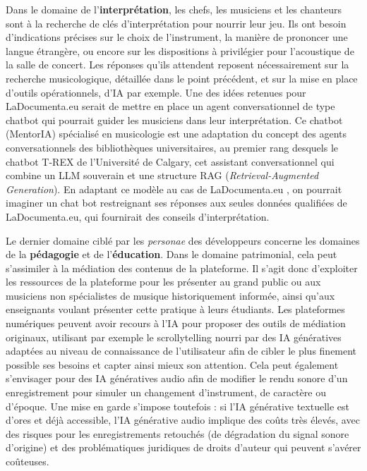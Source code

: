 Dans le domaine de l’\textbf{interprétation}, les chefs, les musiciens et les chanteurs sont à la recherche de clés d’interprétation pour nourrir leur jeu. Ils ont besoin d’indications précises sur le choix de l’instrument, la manière de prononcer une langue étrangère, ou encore sur les dispositions à privilégier pour l’acoustique de la salle de concert. Les réponses qu’ils attendent reposent nécessairement sur la recherche musicologique, détaillée dans le point précédent, et sur la mise en place d’outils opérationnels, d’IA par exemple. Une des idées retenues pour LaDocumenta.eu serait de mettre en place un agent conversationnel de type chatbot qui pourrait guider les musiciens dans leur interprétation. Ce chatbot (MentorIA) spécialisé en musicologie est une adaptation du concept des agents conversationnels des bibliothèques universitaires, au premier rang desquels le chatbot T-REX de l'Université de Calgary, cet assistant conversationnel qui combine un LLM souverain et une structure RAG (\textit{Retrieval-Augmented Generation}).
En adaptant ce modèle au cas de LaDocumenta.eu , on pourrait imaginer un chat bot restreignant ses réponses aux seules données qualifiées de LaDocumenta.eu, qui fournirait des conseils d'interprétation. 


Le dernier domaine ciblé par les \textit{personae} des développeurs concerne les domaines de la \textbf{pédagogie} et de l’\textbf{éducation}. Dans le domaine patrimonial, cela peut s’assimiler à la médiation des contenus de la plateforme. Il s’agit donc d’exploiter les ressources de la plateforme pour les présenter au grand public ou aux musiciens non spécialistes de musique historiquement informée, ainsi qu’aux enseignants voulant présenter  cette pratique à leurs étudiants. Les plateformes numériques peuvent avoir recours à l’IA pour proposer des outils de médiation originaux, utilisant par exemple le scrollytelling nourri par des IA génératives adaptées au niveau de connaissance de l’utilisateur afin de cibler le plus finement possible ses besoins et capter ainsi mieux son attention. Cela peut également s’envisager pour des IA génératives audio afin de modifier le rendu sonore d’un enregistrement pour simuler un changement d’instrument, de caractère ou d’époque. 
Une mise en garde s’impose toutefois : si l’IA générative textuelle est d’ores et déjà accessible, l’IA générative audio implique des coûts très élevés, avec des risques pour les enregistrements retouchés (de dégradation du signal sonore d’origine) et des problématiques juridiques de droits d’auteur qui peuvent s’avérer coûteuses.

